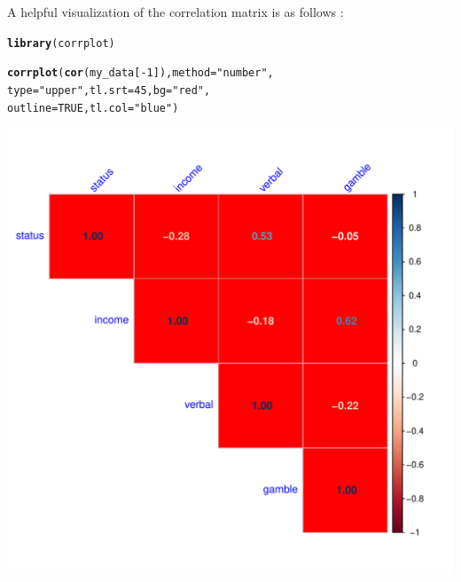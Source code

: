 \documentclass[11pt, a4paper]{article}\usepackage[]{graphicx}\usepackage[]{xcolor}
\makeatletter
\def\maxwidth{ %
  \ifdim\Gin@nat@width>\linewidth
    \linewidth
  \else
    \Gin@nat@width
  \fi
}
\newcommand{\hlnum}[1]{\textcolor[rgb]{0.686,0.059,0.569}{#1}}%
\newcommand{\hlstr}[1]{\textcolor[rgb]{0.192,0.494,0.8}{#1}}%
\newcommand{\hlopt}[1]{\textcolor[rgb]{0,0,0}{#1}}%
\newcommand{\hlstd}[1]{\textcolor[rgb]{0.345,0.345,0.345}{#1}}%
\newcommand{\hlkwc}[1]{\textcolor[rgb]{0.333,0.667,0.333}{#1}}%
\newcommand{\hlkwd}[1]{\textcolor[rgb]{0.737,0.353,0.396}{\textbf{#1}}}%
\newenvironment{kframe}{%
 \def\at@end@of@kframe{}%
 \ifinner\ifhmode%
  \def\at@end@of@kframe{\end{minipage}}%
  \begin{minipage}{\columnwidth}%
 \fi\fi%
 \def\FrameCommand##1{\hskip\@totalleftmargin \hskip-\fboxsep
 \colorbox{shadecolor}{##1}\hskip-\fboxsep
     \hskip-\linewidth \hskip-\@totalleftmargin \hskip\columnwidth}%
 \MakeFramed {\advance\hsize-\width
   \@totalleftmargin\z@ \linewidth\hsize
   \@setminipage}}%
 {\par\unskip\endMakeFramed%
 \at@end@of@kframe}
\newenvironment{knitrout}{}{} %
\makeatother
\begin{document}
A helpful visualization of the correlation matrix is as follows :
\begin{knitrout}
\color{fgcolor}\begin{kframe}
\begin{alltt}
\hlkwd{library}\hlstd{(corrplot)}
\end{alltt}


{\ttfamily\noindent\color{warningcolor}{\#\# Warning: package 'corrplot' was built under R version 4.2.3}}

{\ttfamily\noindent\itshape\color{messagecolor}{\#\# corrplot 0.92 loaded}}\end{kframe}
\end{knitrout}

\begin{knitrout}
\color{fgcolor}\begin{kframe}
\begin{alltt}
\hlkwd{corrplot}\hlstd{(}\hlkwd{cor}\hlstd{(my_data[}\hlopt{-}\hlnum{1}\hlstd{]),} \hlkwc{method} \hlstd{=} \hlstr{"number"}\hlstd{,}
    \hlkwc{type} \hlstd{=} \hlstr{"upper"}\hlstd{,} \hlkwc{tl.srt} \hlstd{=} \hlnum{45}\hlstd{,} \hlkwc{bg} \hlstd{=} \hlstr{"red"}\hlstd{,}
    \hlkwc{outline} \hlstd{=} \hlnum{TRUE}\hlstd{,} \hlkwc{tl.col} \hlstd{=} \hlstr{"blue"}\hlstd{)}
\end{alltt}
\end{kframe}
\includegraphics[width=\maxwidth]{figure/unnamed-chunk-14-1} 
\end{knitrout}
\end{document}
